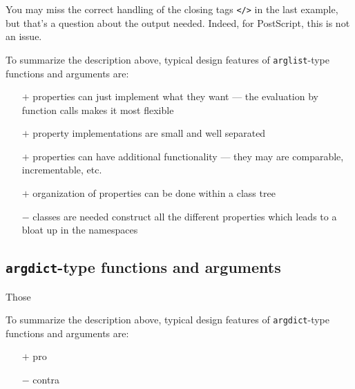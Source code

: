 \documentclass{article}
\begin{document}
You may miss the correct handling of the closing tags \verb|</>| in
the last example, but that's a question about the output needed.
Indeed, for PostScript, this is not an issue.

To summarize the description above, typical design features of
\verb|arglist|-type functions and arguments are:

\begin{itemize}
\item[$+$]
properties can just implement what they want --- the evaluation by
function calls makes it most flexible
\item[$+$]
property implementations are small and well separated
\item[$+$]
properties can have additional functionality --- they may are
comparable, incrementable, etc.
\item[$+$]
organization of properties can be done within a class tree
\item[$-$]
classes are needed construct all the different properties which leads
to a bloat up in the namespaces
\end{itemize}

\subsection*{\texttt{argdict}-type functions and arguments}

Those 

To summarize the description above, typical design features of
\verb|argdict|-type functions and arguments are:
\begin{itemize}
\item[$+$]pro
\item[$-$]contra
\end{itemize}
\end{document}
